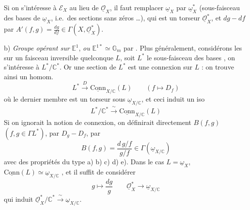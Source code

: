\documentclass[11pt,a4paper]{article}
\begin{document}
Si on s'intéresse à $\mathcal{E}_X$ au lieu de $\underline{\mathcal{O}}_X$, il faut remplacer $\underline{\omega}_X$ par $\underline{\omega}_X^*$ (sous-faisceau des bases de $\underline{\omega}_X$, i.e.\ des sections sans zéros …), qui est un torseur   $\underline{\mathcal{O}}_X^*$, et $dg - df$ par  $A'(f,g) = \frac{dg}{df} \in \Gamma(X, \underline{\mathcal{O}}_X^*)$.

b) \emph{Groupe opérant sur} $\mathbb{E}^1$, \emph{ou} $\mathbb{E}^{1*} \simeq \mathbb{G}_m$ par  . Plus généralement, considérons les  sur un faisceau inversible quelconque $L$, soit $L^*$ le sous-faisceau des bases , on s'intéresse à $L^*/\mathbb{C}^*$. Or une section de $L^*$ est  une connexion sur $L$ : on trouve ainsi un homom.
\[
L^* \xrightarrow{\ D\ } \underline{\mathrm{Conn}}_{X/\mathbb{C}}(L) \qquad (f \longmapsto D_f)
\]
où le dernier membre est un torseur sous $\underline{\omega}_{X/\mathbb{C}}$, et ceci induit un  iso
\[
L^*/\mathbb{C}^* \xrightarrow{\ \sim\ } \underline{\mathrm{Conn}}_{X/\mathbb{C}}(L)
\]
Si on ignorait la notion de connexion,  on définirait directement $B(f,g)$ $(f, g \in \Gamma L^*)$, par  $D_g - D_f$, par
\[
B(f,g) = \frac{d\, g/f}{g/f} \in \Gamma(\underline{\omega}_{X/\mathbb{C}})
\]
avec des propriétés du type a) b) c) d) e). Dans le cas $L = \underline{\omega}_X$, $\underline{\mathrm{Conn}}(L) \simeq \underline{\omega}_{X/\mathbb{C}}$ , et il suffit de considérer
\[
g \longmapsto \frac{dg}{g} \qquad \underline{\mathcal{O}}_X^* \longrightarrow \underline{\omega}_{X/\mathbb{C}}
\]
qui induit $\underline{\mathcal{O}}_X^*/\mathbb{C}^* \xrightarrow{\ \sim\ } \underline{\omega}_{X/\mathbb{C}}$.
\end{document}
